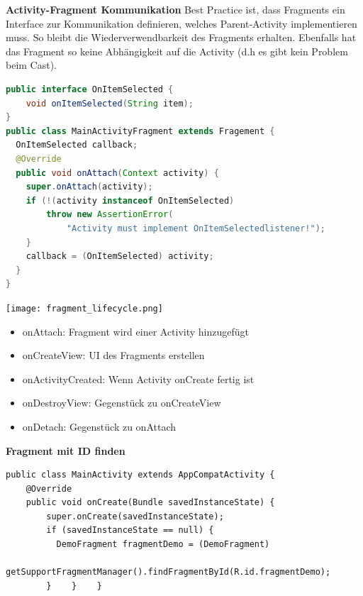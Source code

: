 \textbf{Activity-Fragment Kommunikation}
Best Practice ist, dass Fragments ein Interface zur Kommunikation definieren, welches Parent-Activity implementieren muss. So bleibt die Wiederverwendbarkeit des Fragments erhalten. Ebenfalls hat das Fragment so keine Abhängigkeit auf die Activity (d.h es gibt kein Problem beim Cast).
\begin{lstlisting}[language=java]
public interface OnItemSelected {
    void onItemSelected(String item);
}
public class MainActivityFragment extends Fragement {
  OnItemSelected callback;
  @Override
  public void onAttach(Context activity) {
    super.onAttach(activity);
    if (!(activity instanceof OnItemSelected)
        throw new AssertionError( 
            "Activity must implement OnItemSelectedlistener!");
    }
    callback = (OnItemSelected) activity;
  }
}
\end{lstlisting}

\texttt{[image: fragment\_lifecycle.png]}
\begin{itemize}
    \item onAttach: Fragment wird einer Activity hinzugefügt
    \item onCreateView: UI des Fragments erstellen
    \item onActivityCreated: Wenn Activity onCreate fertig ist
    \item onDestroyView: Gegenstück zu onCreateView
    \item onDetach: Gegenstück zu onAttach
\end{itemize}

\textbf{Fragment mit ID finden}
\begin{lstlisting}
public class MainActivity extends AppCompatActivity {
    @Override
    public void onCreate(Bundle savedInstanceState) {
        super.onCreate(savedInstanceState);
        if (savedInstanceState == null) {
          DemoFragment fragmentDemo = (DemoFragment) 
              getSupportFragmentManager().findFragmentById(R.id.fragmentDemo);
        }    }    }
\end{lstlisting}















